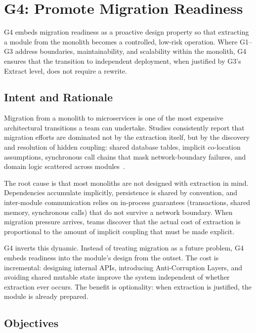 \pagebreak
\section{G4: Promote Migration Readiness}
\label{sec:g4-promote-migration-readiness}

G4 embeds migration readiness as a proactive design property so that extracting a module from the monolith becomes a controlled, low-risk operation. Where G1--G3 address boundaries, maintainability, and scalability within the monolith, G4 ensures that the transition to independent deployment, when justified by G3's Extract level, does not require a rewrite.

\subsection*{Intent and Rationale}

Migration from a monolith to microservices is one of the most expensive architectural transitions a team can undertake. Studies consistently report that migration efforts are dominated not by the extraction itself, but by the discovery and resolution of hidden coupling: shared database tables, implicit co-location assumptions, synchronous call chains that mask network-boundary failures, and domain logic scattered across modules~\cite{fritzsch2019, abgaz2023decomposition, wolfart2021modernizing, newman2019monolith}.

The root cause is that most monoliths are not designed with extraction in mind. Dependencies accumulate implicitly, persistence is shared by convention, and inter-module communication relies on in-process guarantees (transactions, shared memory, synchronous calls) that do not survive a network boundary. When migration pressure arrives, teams discover that the actual cost of extraction is proportional to the amount of implicit coupling that must be made explicit.

G4 inverts this dynamic. Instead of treating migration as a future problem, G4 embeds readiness into the module's design from the outset. The cost is incremental: designing internal APIs, introducing Anti-Corruption Layers, and avoiding shared mutable state improve the system independent of whether extraction ever occurs. The benefit is optionality: when extraction is justified, the module is already prepared.

\subsection*{Objectives}

